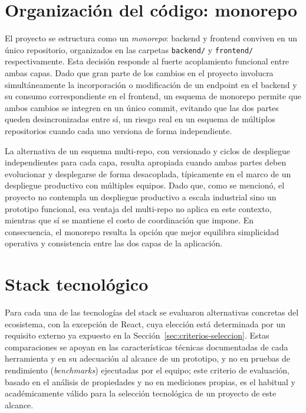 \section{Organización del código: monorepo}

El proyecto se estructura como un \emph{monorepo}: backend y frontend conviven en un único repositorio, organizados en las carpetas \texttt{backend/} y \texttt{frontend/} respectivamente. Esta decisión responde al fuerte acoplamiento funcional entre ambas capas. Dado que gran parte de los cambios en el proyecto involucra simultáneamente la incorporación o modificación de un endpoint en el backend y su consumo correspondiente en el frontend, un esquema de monorepo permite que ambos cambios se integren en un único commit, evitando que las dos partes queden desincronizadas entre sí, un riesgo real en un esquema de múltiplos repositorios cuando cada uno versiona de forma independiente.

La alternativa de un esquema multi-repo, con versionado y ciclos de despliegue independientes para cada capa, resulta apropiada cuando ambas partes deben evolucionar y desplegarse de forma desacoplada, típicamente en el marco de un despliegue productivo con múltiples equipos. Dado que, como se mencionó, el proyecto no contempla un despliegue productivo a escala industrial sino un prototipo funcional, esa ventaja del multi-repo no aplica en este contexto, mientras que sí se mantiene el costo de coordinación que impone. En consecuencia, el monorepo resulta la opción que mejor equilibra simplicidad operativa y consistencia entre las dos capas de la aplicación.

\section{Stack tecnológico}
\label{sec:stack-tecnologico}

Para cada una de las tecnologías del stack se evaluaron alternativas concretas del ecosistema, con la excepción de React, cuya elección está determinada por un requisito externo ya expuesto en la Sección~\ref{sec:criterios-seleccion}. Estas comparaciones se apoyan en las características técnicas documentadas de cada herramienta y en su adecuación al alcance de un prototipo, y no en pruebas de rendimiento (\emph{benchmarks}) ejecutadas por el equipo; este criterio de evaluación, basado en el análisis de propiedades y no en mediciones propias, es el habitual y académicamente válido para la selección tecnológica de un proyecto de este alcance.

